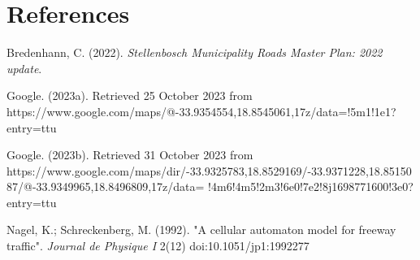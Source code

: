 \documentclass{article}
\begin{document}
\pagebreak

\section*{References}

Bredenhann, C. (2022). \textit{Stellenbosch Municipality Roads Master Plan: 2022 update}.

Google. (2023a). Retrieved 25 October 2023 from https://www.google.com/maps/@-33.9354554,18.8545061,17z/data=!5m1!1e1?entry=ttu

Google. (2023b). Retrieved 31 October 2023 from https://www.google.com/maps/dir/-33.9325783,18.8529169/-33.9371228,18.8515087/@-33.9349965,18.8496809,17z/data=
!4m6!4m5!2m3!6e0!7e2!8j1698771600!3e0?entry=ttu

Nagel, K.; Schreckenberg, M. (1992). "A cellular automaton model for freeway traffic". \textit{Journal de Physique I} 2(12) doi:10.1051/jp1:1992277
\end{document}
